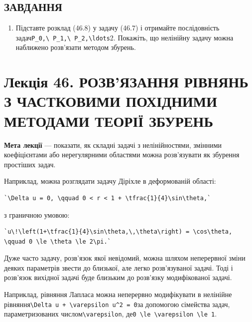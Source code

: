 \documentclass[
  ukrainian,
]{article}
\providecommand{\tightlist}{%
  \setlength{\itemsep}{0pt}\setlength{\parskip}{0pt}}
\begin{document}
\subsection{ЗАВДАННЯ}\label{ux437ux430ux432ux434ux430ux43dux43dux44f-10}

\begin{enumerate}
\def\labelenumi{\arabic{enumi}.}
\tightlist
\item
  Підставте розклад (46.8) у задачу (46.7) і отримайте послідовність
  задач\texttt{P\_0,\textbackslash{}\ P\_1,\textbackslash{}\ P\_2,\textbackslash{}ldots}2.
  Покажіть, що нелінійну задачу можна наближено розв'язати методом
  збурень.
\end{enumerate}

\section{Лекція 46. РОЗВ'ЯЗАННЯ РІВНЯНЬ З ЧАСТКОВИМИ ПОХІДНИМИ МЕТОДАМИ
ТЕОРІЇ
ЗБУРЕНЬ}\label{ux43bux435ux43aux446ux456ux44f-46.-ux440ux43eux437ux432ux44fux437ux430ux43dux43dux44f-ux440ux456ux432ux43dux44fux43dux44c-ux437-ux447ux430ux441ux442ux43aux43eux432ux438ux43cux438-ux43fux43eux445ux456ux434ux43dux438ux43cux438-ux43cux435ux442ux43eux434ux430ux43cux438-ux442ux435ux43eux440ux456ux457-ux437ux431ux443ux440ux435ux43dux44c}

\textbf{Мета лекції} --- показати, як складні задачі з нелінійностями,
змінними коефіцієнтами або нерегулярними областями можна розв'язувати як
збурення простіших задач.

Наприклад, можна розглядати задачу Діріхле в деформованій області:

\begin{verbatim}
`\Delta u = 0, \qquad 0 < r < 1 + \tfrac{1}{4}\sin\theta,`
\end{verbatim}

з граничною умовою:

\begin{verbatim}
`u\!\left(1+\tfrac{1}{4}\sin\theta,\,\theta\right) = \cos\theta, \qquad 0 \le \theta \le 2\pi.`
\end{verbatim}

Дуже часто задачу, розв'язок якої невідомий, можна шляхом неперервної
зміни деяких параметрів звести до близької, але легко розв'язуваної
задачі. Тоді і розв'язок вихідної задачі буде близьким до розв'язку
модифікованої задачі.

Наприклад, рівняння Лапласа можна неперервно модифікувати в нелінійне
рівняння\texttt{\textbackslash{}Delta\ u\ +\ \textbackslash{}varepsilon\ u\^{}2\ =\ 0}за
допомогою сімейства задач, параметризованих
числом\texttt{\textbackslash{}varepsilon},
де\texttt{0\ \textbackslash{}le\ \textbackslash{}varepsilon\ \textbackslash{}le\ 1}.
\end{document}
